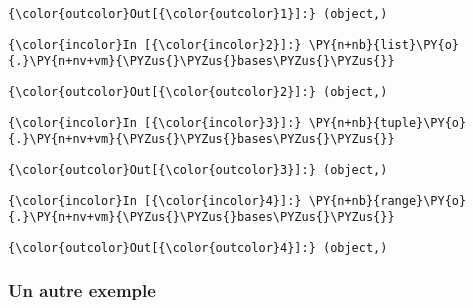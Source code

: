 \begin{Verbatim}[commandchars=\\\{\},frame=single,framerule=0.3mm,rulecolor=\color{cellframecolor}]
{\color{outcolor}Out[{\color{outcolor}1}]:} (object,)
\end{Verbatim}
            
    \begin{Verbatim}[commandchars=\\\{\},frame=single,framerule=0.3mm,rulecolor=\color{cellframecolor}]
{\color{incolor}In [{\color{incolor}2}]:} \PY{n+nb}{list}\PY{o}{.}\PY{n+nv+vm}{\PYZus{}\PYZus{}bases\PYZus{}\PYZus{}}
\end{Verbatim}


\begin{Verbatim}[commandchars=\\\{\},frame=single,framerule=0.3mm,rulecolor=\color{cellframecolor}]
{\color{outcolor}Out[{\color{outcolor}2}]:} (object,)
\end{Verbatim}
            
    \begin{Verbatim}[commandchars=\\\{\},frame=single,framerule=0.3mm,rulecolor=\color{cellframecolor}]
{\color{incolor}In [{\color{incolor}3}]:} \PY{n+nb}{tuple}\PY{o}{.}\PY{n+nv+vm}{\PYZus{}\PYZus{}bases\PYZus{}\PYZus{}}
\end{Verbatim}


\begin{Verbatim}[commandchars=\\\{\},frame=single,framerule=0.3mm,rulecolor=\color{cellframecolor}]
{\color{outcolor}Out[{\color{outcolor}3}]:} (object,)
\end{Verbatim}
            
    \begin{Verbatim}[commandchars=\\\{\},frame=single,framerule=0.3mm,rulecolor=\color{cellframecolor}]
{\color{incolor}In [{\color{incolor}4}]:} \PY{n+nb}{range}\PY{o}{.}\PY{n+nv+vm}{\PYZus{}\PYZus{}bases\PYZus{}\PYZus{}}
\end{Verbatim}


\begin{Verbatim}[commandchars=\\\{\},frame=single,framerule=0.3mm,rulecolor=\color{cellframecolor}]
{\color{outcolor}Out[{\color{outcolor}4}]:} (object,)
\end{Verbatim}
            
    \hypertarget{un-autre-exemple}{%
\subsubsection{Un autre exemple}\label{un-autre-exemple}}


